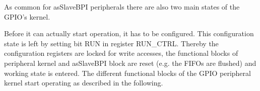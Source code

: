As common for asSlaveBPI peripherals there are also two main states of the GPIO’s kernel.

Before it can actually start operation, it has to be configured. This configuration state is left by setting bit RUN in register RUN\_CTRL. Thereby the configuration registers are locked for write accesses, the functional blocks of peripheral kernel and asSlaveBPI block are reset (e.g. the FIFOs are flushed) and working state is entered. The different functional blocks of the GPIO peripheral kernel start operating as described in the following.

